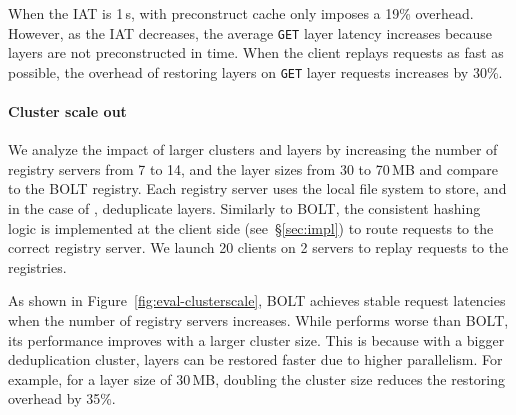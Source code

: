 When the IAT is 1\,s, \sysname with preconstruct cache only imposes a 19\% overhead.
%
However, as the IAT decreases, the average \texttt{GET} layer latency increases because
layers are not preconstructed in time.
%
When the client replays requests as fast as possible, the overhead of restoring layers on
\texttt{GET} layer requests increases by 30\%.
%


\paragraph{Cluster scale out}
%
We analyze the impact of larger clusters and layers by increasing the number of registry servers from
7 to 14, and the layer sizes from 30 to 70\,MB and compare \sysname to the BOLT registry.
%
Each registry server uses the local file system to store, and in the case of \sysname, deduplicate layers.
%
Similarly to BOLT, the consistent hashing logic is implemented at the client
side (see~\S\ref{sec:impl}) to route requests to the correct registry server.
We launch 20 clients on 2 servers to replay requests to the registries.

As shown in Figure~\ref{fig:eval-clusterscale}, BOLT achieves stable request latencies when
the number of registry servers increases.
%
While \sysname performs worse than BOLT, its performance improves with a larger cluster size.
%
This is because with a bigger deduplication cluster, layers can be restored faster due to higher
parallelism.
%
For example, for a layer size of 30\,MB, doubling the cluster size reduces the restoring
overhead by 35\%.

